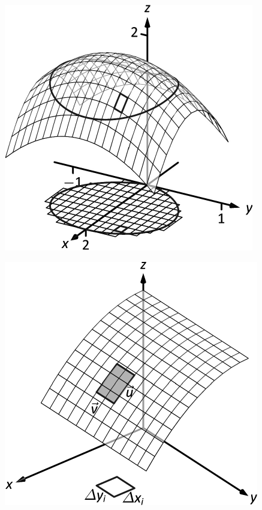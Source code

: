 \documentclass[10pt]{article}
\begin{document}
\includegraphics{figsurfacearea_intro1_3DBW.pdf}
\texttt{}

\includegraphics{figsurfacearea_intro2_3DBW.pdf}
\texttt{}
\end{document}
